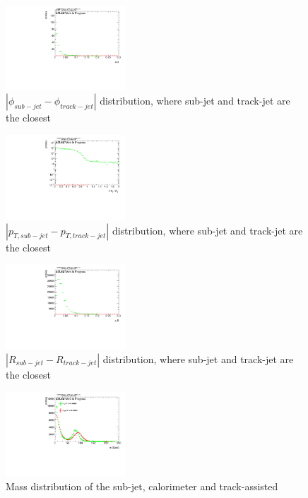 \begin{figure}
 
\includegraphics[width=0.4\textwidth]{appendixB/mTAS_W_calibmCal_20:07:01-03-11-2016/1cfrt_h_SubJet_Delta_psi.pdf}
\caption{$| \phi_{sub-jet} - \phi_{track-jet} | $ distribution, where sub-jet and track-jet are the closest}
 
\end{figure}
\begin{figure}
 
\includegraphics[width=0.4\textwidth]{appendixB/mTAS_W_calibmCal_20:07:01-03-11-2016/1cfrt_h_SubJet_Delta_pt.pdf}
\caption{$| p_{T,sub-jet} - p_{T,track-jet} | $ distribution, where sub-jet and track-jet are the closest}
 
\end{figure}
 
\begin{figure}
 
\includegraphics[width=0.4\textwidth]{appendixB/mTAS_W_calibmCal_20:07:01-03-11-2016/1cfrt_h_SubJet_Delta_R.pdf}
\caption{$| R_{sub-jet} - R_{track-jet} | $ distribution, where sub-jet and track-jet are the closest}
 
\end{figure}
 
\begin{figure}
 
\includegraphics[width=0.4\textwidth]{appendixB/mTAS_W_calibmCal_20:07:01-03-11-2016/1cfrt_h_SubJet_m.pdf}
\caption{Mass distribution of the sub-jet, calorimeter and track-assisted}
 
\end{figure}
 
